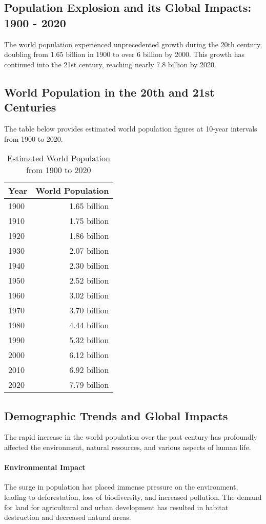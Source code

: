 \documentclass[a4paper,12pt]{book}
\begin{document}
\subsection*{Population Explosion and its Global Impacts: 1900 - 2020}
The world population experienced unprecedented growth during the 20th century, doubling from 1.65 billion in 1900 to over 6 billion by 2000. This growth has continued into the 21st century, reaching nearly 7.8 billion by 2020.

\subsection*{World Population in the 20th and 21st Centuries}
The table below provides estimated world population figures at 10-year intervals from 1900 to 2020.

\begin{table}[h!]
\centering
\begin{tabular}{|l|r|}
\hline
Year & World Population \\
\hline
1900 & 1.65 billion \\
1910 & 1.75 billion \\
1920 & 1.86 billion \\
1930 & 2.07 billion \\
1940 & 2.30 billion \\
1950 & 2.52 billion \\
1960 & 3.02 billion \\
1970 & 3.70 billion \\
1980 & 4.44 billion \\
1990 & 5.32 billion \\
2000 & 6.12 billion \\
2010 & 6.92 billion \\
2020 & 7.79 billion \\
\hline
\end{tabular}
\caption{Estimated World Population from 1900 to 2020}
\label{tab:world_population_1900_2020}
\end{table}

\subsection*{Demographic Trends and Global Impacts}
The rapid increase in the world population over the past century has profoundly affected the environment, natural resources, and various aspects of human life.

\paragraph{Environmental Impact}
The surge in population has placed immense pressure on the environment, leading to deforestation, loss of biodiversity, and increased pollution. The demand for land for agricultural and urban development has resulted in habitat destruction and decreased natural areas.
\end{document}
